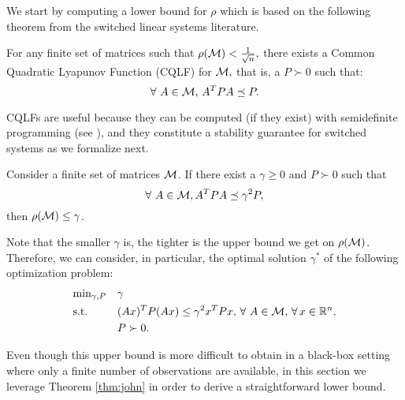 We start by computing a lower bound for $\rho$ which is based on the following theorem from the switched linear systems literature.
\begin{theorem}\cite[Theorem 2.11]{jungers_lncis}\label{thm:john}
For any finite set of matrices such that $\rho(\mathcal{M})<\frac{1}{\sqrt{n}},$ there exists a Common Quadratic Lyapunov Function (CQLF) for $\mathcal{M},$ that is, a $P\succ 0$ such that: $$\forall\ A\in \mathcal{M},\, A^TPA\preceq P. $$
\end{theorem}

CQLFs are useful because they can be computed (if they exist) with semidefinite programming (see \cite{boyd}), and they constitute a stability guarantee for switched systems as we formalize next.\begin{theorem}\cite[Prop. 2.8]{jungers_lncis}\label{thm:cqlf} Consider a finite set of matrices $\mathcal{M}$. If there exist a $\gamma \geq 0$ and $P \succ 0$ such that $$\forall\ A \in \mathcal{M}, A^TPA \preceq \gamma^2P,$$ then $\rho(\mathcal{M}) \leq \gamma$.
\end{theorem}


Note that the smaller $\gamma$ is, the tighter is the upper bound we get on $\rho(\mathcal{M})$. Therefore, we can consider, in particular, the optimal solution $\gamma^*$ of the following optimization problem:
\begin{equation}\label{eqn:campiOpt0}
\begin{aligned}
& \text{min}_{\gamma, P} & & \gamma \\
& \text{s.t.} 
&  & (Ax)^TP(Ax) \leq \gamma^2 x^TPx,\,\forall\ A \in \mathcal{M}, \,\forall\, x \in \mathbb{R}^n,\\
& && P \succ 0. \\
\end{aligned}
\end{equation}

Even though this upper bound is more difficult to obtain in a black-box setting where only a finite number of observations are available, in this section we leverage Theorem \ref{thm:john} in order to derive a straightforward lower bound.

